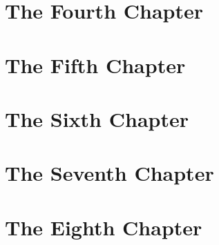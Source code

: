 \documentclass{book}
\begin{document}
\part{The Fourth Chapter}


\part{The Fifth Chapter}


\part{The Sixth Chapter}


\part{The Seventh Chapter}


\part{The Eighth Chapter}

\end{document}

